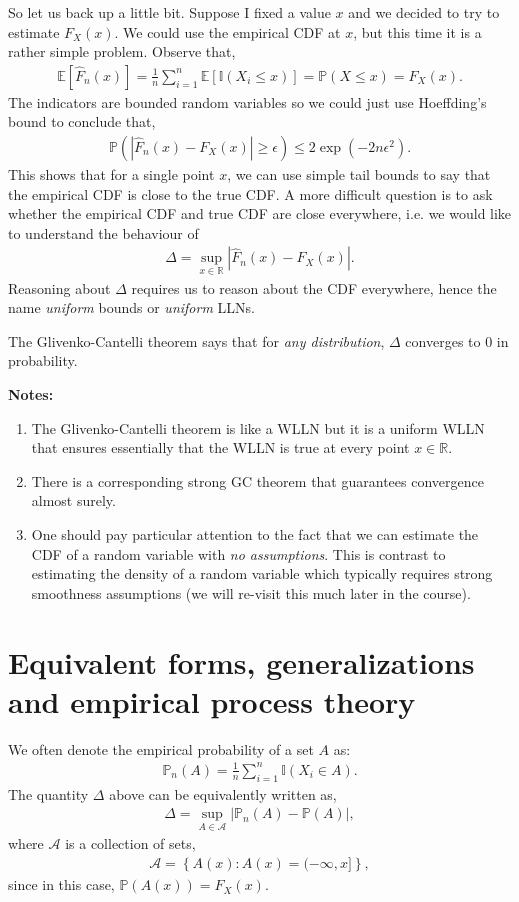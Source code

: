 \documentclass[twoside,12pt]{article}
\begin{document}
So let us back up a little bit. Suppose I fixed a value $x$ and we decided to try to estimate $F_X(x)$. 
We could use the empirical CDF at $x$, but this time it is a rather simple problem. Observe that,
\begin{align*}
\mathbb{E}[\widehat{F}_n(x)] = \frac{1}{n} \sum_{i=1}^n\mathbb{E}[ \mathbb{I}(X_i \leq x)] = \mathbb{P}(X \leq x) = F_X(x).
\end{align*}
The indicators are bounded random variables so we could just use Hoeffding's bound to conclude that,
\begin{align*}
\mathbb{P}( |\widehat{F}_n(x) - F_X(x)| \geq \epsilon) \leq 2 \exp (- 2 n \epsilon^2). 
\end{align*}
This shows that for a single point $x$, we can use simple tail bounds to say that the empirical CDF is close to the true CDF. A more difficult question is to ask whether the empirical CDF and true CDF are close everywhere, i.e. we would like to understand the behaviour of 
\begin{align*}
\Delta = \sup_{x \in \mathbb{R}} | \widehat{F}_n(x) - F_X(x)|.
\end{align*}
Reasoning about $\Delta$ requires us to reason about the CDF everywhere, hence the name \emph{uniform} bounds or \emph{uniform} LLNs. 

The Glivenko-Cantelli theorem says that for \emph{any distribution}, $\Delta$ converges to 0 in probability.

{\bf Notes: } 
\begin{enumerate}
\item The Glivenko-Cantelli theorem is like a WLLN but it is a uniform WLLN that ensures essentially that the WLLN is true at every point $x \in \mathbb{R}$.
\item There is a corresponding strong GC theorem that guarantees convergence almost surely. 
\item One should pay particular attention to the fact that we can estimate the CDF of a random variable with \emph{no assumptions}. This is contrast to estimating the density of a random variable which typically requires strong smoothness assumptions (we will re-visit this much later in the course).
\end{enumerate}

\section{Equivalent forms, generalizations and empirical process theory}
We often denote the empirical probability of a set $A$ as:
\begin{align*}
\mathbb{P}_n(A) = \frac{1}{n} \sum_{i=1}^n \mathbb{I}(X_i \in A).
\end{align*}
The quantity $\Delta$ above can be equivalently written as,
\begin{align*}
\Delta = \sup_{A \in \mathcal{A}} |\mathbb{P}_n(A) - \mathbb{P}(A)|,
\end{align*}
where $\mathcal{A}$ is a collection of sets,
\begin{align*}
\mathcal{A} = \left\{A(x): A(x) = (-\infty, x] \right\}, 
\end{align*}
since in this case, $\mathbb{P}(A(x)) = F_X(x).$
\end{document}
